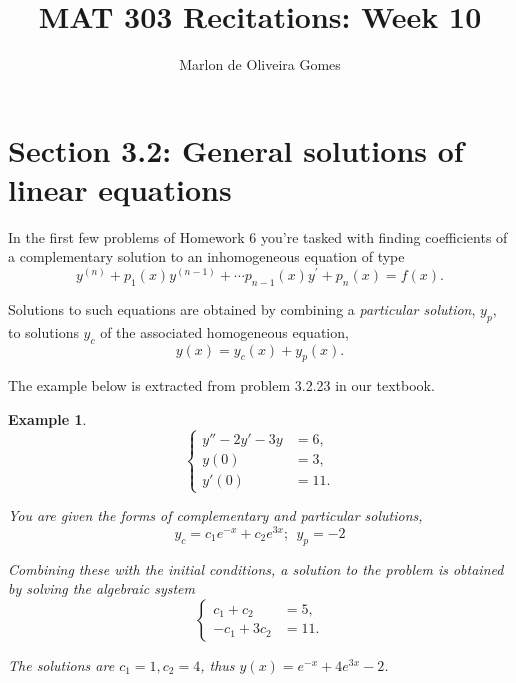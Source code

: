 \documentclass[11pt]{amsart}
\title{MAT 303 Recitations: Week 10}
\author[M. Gomes]{Marlon de Oliveira Gomes}
\newtheorem{example}{Example}
\numberwithin{equation}{section}
\begin{document}
\maketitle


\section*{Section 3.2: General solutions of linear equations}

In the first few problems of Homework 6 you're tasked with finding coefficients of a complementary solution to an inhomogeneous equation of type
\begin{equation*}
y^{(n)}+p_1(x)y^{(n-1)} + \cdots p_{n-1}(x)y^{'}+p_n(x) = f(x).
\end{equation*}

Solutions to such equations are obtained by combining a {\emph{particular solution}}, $y_p$, to solutions $y_c$ of the associated homogeneous equation,
\begin{equation*}
y(x)=y_c(x)+y_p(x).
\end{equation*}

The example below is extracted from problem 3.2.23 in our textbook. 
\begin{example}

\begin{equation*}
\left\{
\begin{array}{rl}
y''-2y'-3y & = 6, \\
y(0) & = 3,\\
y'(0) & =11.
\end{array}
\right.
\end{equation*}


You are given the forms of complementary and particular solutions,
\begin{equation*}
y_c = c_1e^{-x}+c_2e^{3x}; \ \ y_p=-2
\end{equation*}

Combining these with the initial conditions, a solution to the problem is obtained by solving the algebraic system
\begin{equation*}
\left\{
\begin{array}{rl}
c_1+c_2 & = 5, \\
-c_1+ 3c_2 & = 11.
\end{array}
\right.
\end{equation*}

The solutions are $c_1=1, c_2=4$, thus $y(x)=e^{-x}+4e^{3x}-2$.
\end{example}
\end{document}
